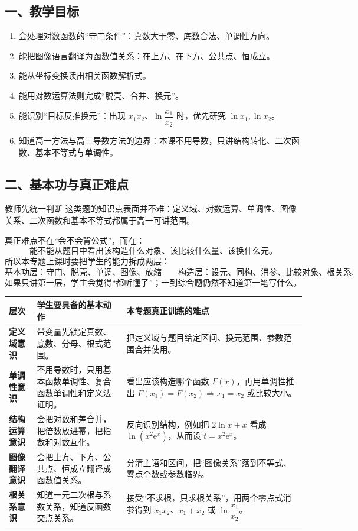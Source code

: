 \documentclass[11pt,a4paper]{ctexart}
\newcommand{\e}{\mathrm{e}}
\begin{document}
\subsection*{一、教学目标}
\begin{enumerate}
  \item 会处理对数函数的“守门条件”：真数大于零、底数合法、单调性方向。
  \item 能把图像语言翻译为函数值关系：在上方、在下方、公共点、恒成立。
  \item 能从坐标变换读出相关函数解析式。
  \item 能用对数运算法则完成“脱壳、合并、换元”。
  \item 能识别“目标反推换元”：出现 $x_1x_2$、$\ln\dfrac{x_1}{x_2}$ 时，优先研究 $\ln x_1,\ln x_2$。
  \item 知道高一方法与高三导数方法的边界：本课不用导数，只讲结构转化、二次函数、基本不等式与单调性。
\end{enumerate}

\subsection*{二、基本功与真正难点}

\begin{teachbox}{教师先统一判断}
这类题的知识点表面并不难：定义域、对数运算、单调性、图像关系、二次函数和基本不等式都属于高一可讲范围。

真正难点不在“会不会背公式”，而在：
\[
\boxed{\text{能不能从题目中看出该构造什么对象、该比较什么量、该换什么元。}}
\]
所以本专题上课时要把学生的能力拆成两层：
\[
\boxed{\text{基本功层：守门、脱壳、单调、图像、放缩}}
\qquad
\boxed{\text{构造层：设元、同构、消参、比较对象、根关系}.}
\]
如果只讲第一层，学生会觉得“都听懂了”；一到综合题仍然不知道第一笔写什么。
\end{teachbox}

\begin{center}
\renewcommand{\arraystretch}{1.25}
\begin{tabularx}{0.95\linewidth}{>{\bfseries}p{2.4cm} X X}
\toprule
层次 & 学生要具备的基本动作 & 本专题真正训练的难点 \\
\midrule
定义域意识 & 带变量先锁定真数、底数、分母、根式范围。 & 把定义域与题目给定区间、换元范围、参数范围合并使用。 \\
单调性意识 & 不用导数时，只用基本函数单调性、复合函数单调性和定义法证明。 & 看出应该构造哪个函数 $F(x)$，再用单调性推出 $F(x_1)=F(x_2)\Rightarrow x_1=x_2$ 或比较大小。 \\
结构运算意识 & 会把对数和差合并，把倍数放进幂，把指数和对数互化。 & 反向识别结构，例如把 $2\ln x+x$ 看成 $\ln(x^2\e^x)$，从而设 $t=x^2\e^x$。 \\
图像翻译意识 & 会把上方、下方、公共点、恒成立翻译成函数值关系。 & 分清主语和区间，把“图像关系”落到不等式、零点个数或参数临界。 \\
根关系意识 & 知道一元二次根与系数关系，知道反函数交点关系。 & 接受“不求根，只求根关系”，用两个零点式消参得到 $x_1x_2$、$x_1+x_2$ 或 $\ln\dfrac{x_1}{x_2}$。 \\
\bottomrule
\end{tabularx}
\end{center}
\end{document}
